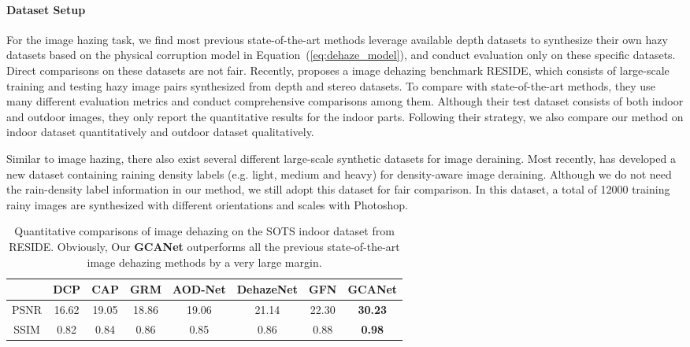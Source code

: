 \documentclass[10pt,twocolumn,letterpaper]{article}
\newcommand{\Eref}[1]{Equation~(\ref{#1})}
\begin{document}
\paragraph{Dataset Setup} For the image hazing task, we find most previous state-of-the-art methods leverage available depth datasets to synthesize their own hazy datasets based on the physical corruption model in \Eref{eq:dehaze_model}, and conduct evaluation only on these specific datasets. Direct comparisons on these datasets are not fair. Recently, \cite{li2017reside} proposes a image dehazing benchmark RESIDE, which consists of large-scale training and testing hazy image pairs synthesized from depth and stereo datasets. To compare with state-of-the-art methods, they use many different evaluation metrics and conduct comprehensive comparisons among them. Although their test dataset consists of both indoor and outdoor images, they only report the quantitative results for the indoor parts. Following their strategy, we also compare our method on indoor dataset quantitatively and outdoor dataset qualitatively.


Similar to image hazing, there also exist several different large-scale synthetic datasets for image deraining. Most recently, \cite{zhang2018density} has developed a new dataset containing raining density labels (e.g. light, medium and heavy) for density-aware image deraining. Although we do not need the rain-density label information in our method, we still adopt this dataset for fair comparison. In this dataset, a total of 12000 training rainy images are synthesized with different orientations and scales with Photoshop.

\renewcommand{\arraystretch}{1.2}
\begin{table*}[t]
\begin{center}
\begin{tabular}{c|ccccccc}
\hline
& DCP \cite{he2011single} & CAP \cite{zhu2015fast} & GRM \cite{chen2016robust} & AOD-Net \cite{li2017aod} & DehazeNet \cite{cai2016dehazenet} & GFN \cite{ren2018gated} & \textbf{GCANet} \\
\hline
PSNR & 16.62 & 19.05 & 18.86 & 19.06 & 21.14 & 22.30 & \textbf{30.23}\\
\hline
SSIM & 0.82 & 0.84 & 0.86 & 0.85 & 0.86 & 0.88 & \textbf{0.98} \\
\hline
\end{tabular}
\vspace{1em}
\caption{Quantitative comparisons of image dehazing on the SOTS indoor dataset from RESIDE. Obviously, Our \textbf{GCANet} outperforms all the previous state-of-the-art image dehazing methods by a very large margin.}
\label{table:dehaze}
\end{center}
\end{table*}
\end{document}

